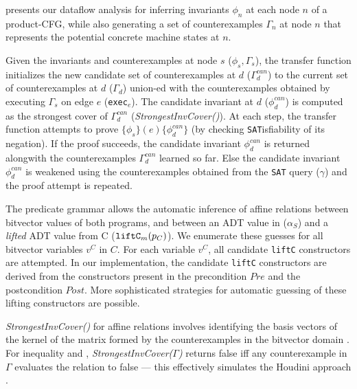 

 presents our dataflow analysis for inferring invariants $\phi_n$
at each node $n$ of a product-CFG, while also generating a set of counterexamples $\Gamma_n$ at node $n$
that represents the potential concrete machine states at $n$.

Given the invariants and counterexamples at node $s$
($\phi_s,\Gamma_s$),
the transfer function initializes the new candidate set
of counterexamples at $d$ ($\Gamma^{can}_{d}$)
to the current set of counterexamples at $d$ ($\Gamma_{d}$) union-ed with
the counterexamples obtained by executing $\Gamma_s$ on edge $e$ ({\tt exec$_e$}).
The candidate invariant at $d$ ($\phi^{can}_d$) is computed
as the strongest cover of $\Gamma^{can}_{d}$ ({\em StrongestInvCover()}).
At each step, the transfer function attempts to prove
$\{\phi_s\} (e) \{\phi^{can}_d\}$ (by checking {\tt SAT}isfiability of its
negation). If the proof succeeds, the candidate invariant $\phi^{can}_d$ is
returned alongwith the counterexamples $\Gamma^{can}_d$ learned so far.
Else the candidate invariant $\phi^{can}_d$ is weakened using
the counterexamples obtained from the {\tt SAT} query ($\gamma$) and the proof attempt is
repeated.

The predicate grammar allows the automatic inference of
affine relations between bitvector values of both
programs, and \recursiveRelations{} between an ADT value in \SpecL{} ($\alpha_S$)
and a {\em lifted} ADT value from C (${\tt liftC}_m(p_C)$).
We enumerate these \recursiveRelation{}
guesses for all bitvector variables $v^{C}$ in $C$. For each variable $v^{C}$,
all candidate {\tt liftC} constructors are attempted. In
our implementation, the candidate
{\tt liftC}
constructors are derived from the constructors
present in the precondition $Pre$
and the postcondition $Post$.  More
sophisticated strategies for automatic guessing of
these lifting constructors
are possible.

{\em StrongestInvCover()} for affine relations involves
identifying the basis vectors of the kernel of the
matrix formed by the counterexamples in the bitvector
domain \cite{esop05,semalign}.
For inequality and
\recursiveRelations{}, {\em StrongestInvCover($\Gamma$)}
returns false iff any counterexample in $\Gamma$ evaluates the
relation to false --- this effectively simulates the Houdini approach \cite{houdini}.

